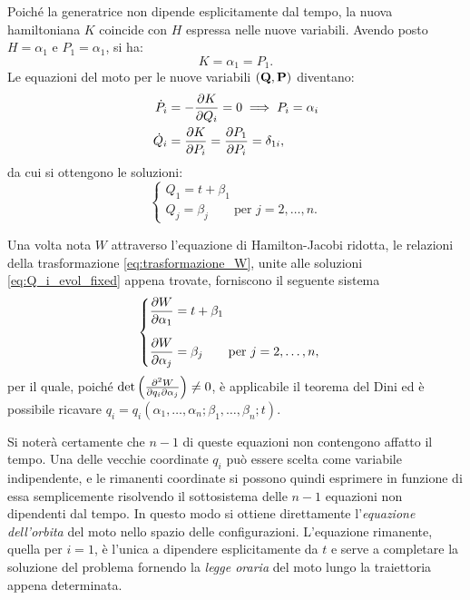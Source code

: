 Poiché la generatrice non dipende esplicitamente dal tempo, la nuova hamiltoniana $K$ coincide con $H$ espressa nelle nuove variabili. Avendo posto $H = \alpha_1$ e $P_1 = \alpha_1$, si ha:
\begin{equation*}
    K = \alpha_1 = P_1.
\end{equation*}
Le equazioni del moto per le nuove variabili $(\vb{Q}, \vb{P})$ diventano:
\begin{align*}
    \dot{P}_i &= -\pdv{K}{Q_i} = 0 \implies P_i = \alpha_i \\
    \dot{Q}_i &= \pdv{K}{P_i} = \pdv{P_1}{P_i} = \delta_{1i},
\end{align*}
da cui si ottengono le soluzioni:
\begin{equation}
    \label{eq:Q_i_evol_fixed}
    \begin{cases}
        Q_1 = t + \beta_1 \\
        Q_j = \beta_j \qquad \text{per } j = 2, \dots, n.
    \end{cases}
\end{equation}

Una volta nota $W$ attraverso l'equazione di Hamilton-Jacobi ridotta, le relazioni della trasformazione \eqref{eq:trasformazione_W}, unite alle soluzioni \eqref{eq:Q_i_evol_fixed} appena trovate, forniscono il seguente sistema
\begin{equation*}
    \begin{cases}
        \displaystyle \pdv{W}{\alpha_1} = t + \beta_1 \\[0.5cm]
        \displaystyle \pdv{W}{\alpha_j} = \beta_j \qquad \text{per } j = 2, \dots, n,
    \end{cases}
\end{equation*}
per il quale, poiché $\det\qty(\pdv{W}{q_i}{\alpha_j}) \neq 0$, è applicabile il teorema del Dini ed è possibile ricavare $q_i = q_i(\alpha_1, \dots, \alpha_n; \beta_1, \dots, \beta_n; t)$.

Si noterà certamente che $n-1$ di queste equazioni non contengono affatto il tempo. Una delle vecchie coordinate $q_i$ può essere scelta come variabile indipendente, e le rimanenti coordinate si possono quindi esprimere in funzione di essa semplicemente risolvendo il sottosistema delle $n-1$ equazioni non dipendenti dal tempo. In questo modo si ottiene direttamente l'\emph{equazione dell'orbita} del moto nello spazio delle configurazioni. L'equazione rimanente, quella per $i=1$, è l'unica a dipendere esplicitamente da $t$ e serve a completare la soluzione del problema fornendo la \emph{legge oraria} del moto lungo la traiettoria appena determinata.

